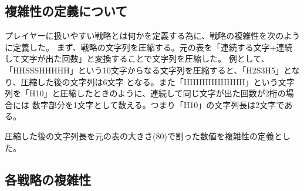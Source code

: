 \subsection{複雑性の定義について}

プレイヤーに扱いやすい戦略とは何かを定義する為に、戦略の複雑性を次のように定義した。
まず、戦略の文字列を圧縮する。元の表を「連続する文字+連続して文字が出た回数」と変換することで文字列を圧縮した。
例として、「HHSSSHHHHH」という10文字からなる文字列を圧縮すると、「H2S3H5」となり、圧縮した後の文字列は6文字
となる。また「HHHHHHHHHH」という文字列を「H10」と圧縮したときのように、連続して同じ文字が出た回数が2桁の場合には
数字部分を1文字として数える。つまり「H10」の文字列長は2文字である。

圧縮した後の文字列長を元の表の大きさ(80)で割った数値を複雑性の定義とした。

\subsection{各戦略の複雑性}



